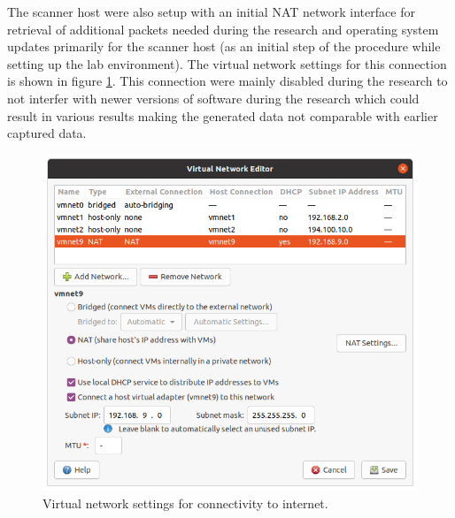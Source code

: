 The scanner host were also setup with an initial NAT network interface for retrieval of additional packets needed during the research and operating system updates primarily for the scanner host (as an initial step of the procedure while setting up the lab environment). The virtual network settings for this connection is shown in figure \ref{fig:VirtNetworkInternet}.
This connection were mainly disabled during the research to not interfer with newer versions of software during the research which could result in various results making the generated data not comparable with earlier captured data.
\begin{figure}[htbp]
\centerline{\includegraphics[scale=0.4]{images/lab/vmnet9.png}}
\caption{Virtual network settings for connectivity to internet.}
\label{fig:VirtNetworkInternet}
\end{figure}

